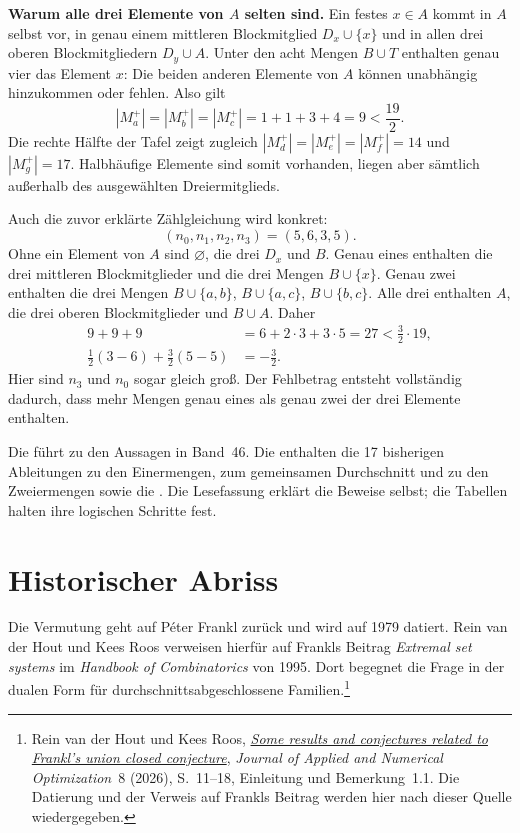 \par{}
\medskip\noindent\textbf{Warum alle drei Elemente von \(A\) selten sind.}
Ein festes \(x\in A\) kommt in \(A\) selbst vor,
in genau einem mittleren Blockmitglied \(D_x\cup\{x\}\)
und in allen drei oberen Blockmitgliedern \(D_y\cup A\).
Unter den acht Mengen \(B\cup T\) enthalten genau vier
das Element \(x\): Die beiden anderen Elemente von \(A\)
können unabhängig hinzukommen oder fehlen. Also gilt
\[
  |M_a^+|=|M_b^+|=|M_c^+|=1+1+3+4=9<\frac{19}{2}.
\]
Die rechte Hälfte der Tafel zeigt zugleich
\(|M_d^+|=|M_e^+|=|M_f^+|=14\) und \(|M_g^+|=17\).
Halbhäufige Elemente sind somit vorhanden, liegen aber
sämtlich außerhalb des ausgewählten Dreiermitglieds.

Auch die zuvor erklärte Zählgleichung wird konkret:
\[
  (n_0,n_1,n_2,n_3)=(5,6,3,5).
\]
Ohne ein Element von \(A\) sind \(\varnothing\), die
drei \(D_x\) und \(B\). Genau eines enthalten die
drei mittleren Blockmitglieder und die drei Mengen
\(B\cup\{x\}\). Genau zwei enthalten die drei Mengen
\(B\cup\{a,b\}\), \(B\cup\{a,c\}\),
\(B\cup\{b,c\}\). Alle drei enthalten \(A\), die
drei oberen Blockmitglieder und \(B\cup A\). Daher
\[
  \begin{aligned}
    9+9+9&=6+2\cdot3+3\cdot5=27<\frac32\cdot19,\\
    \frac12(3-6)+\frac32(5-5)&=-\frac32.
  \end{aligned}
\]
Hier sind \(n_3\) und \(n_0\) sogar gleich groß.
Der Fehlbetrag entsteht vollständig dadurch, dass mehr
Mengen genau eines als genau zwei der drei Elemente enthalten.

Die \FranklMainLink{} führt zu den Aussagen in Band~46.
Die \FranklProofsLink{} enthalten die 17 bisherigen
Ableitungen zu den Einermengen, zum gemeinsamen Durchschnitt
und zu den Zweiermengen sowie die
. Die Lesefassung erklärt die Beweise selbst;
die Tabellen halten ihre logischen Schritte fest.

\par{}
\section*{Historischer Abriss}
\hypertarget{frankl.reading.history}{}

Die Vermutung geht auf Péter Frankl zurück und wird auf
1979 datiert. Rein van der Hout und Kees Roos verweisen
hierfür auf Frankls Beitrag \emph{Extremal set systems}
im \emph{Handbook of Combinatorics} von 1995. Dort begegnet
die Frage in der dualen Form für durchschnittsabgeschlossene
Familien.\footnote{Rein van der Hout und Kees Roos,
\href{https://doi.org/10.23952/jano.8.2026.1.02}{\emph{Some results and conjectures related to Frankl's union closed conjecture}},
\emph{Journal of Applied and Numerical Optimization}~8 (2026),
S.~11--18, Einleitung und Bemerkung~1.1. Die Datierung und
der Verweis auf Frankls Beitrag werden hier nach dieser
Quelle wiedergegeben.}

